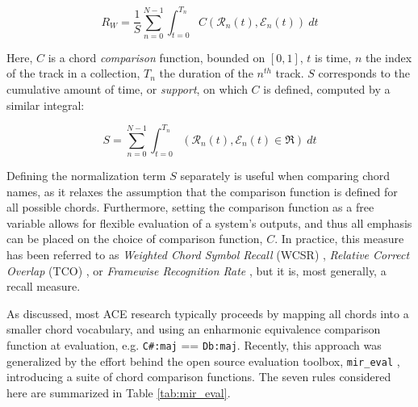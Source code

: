 \begin{equation}
\label{eq:recall_micro}
R_{W} = \frac{1}{S}\sum_{n=0}^{N-1}\int_{t=0}^{T_n}C(\mathcal{R}_n(t), \mathcal{E}_n(t))~dt
\end{equation}

\noindent Here, $C$ is a chord \emph{comparison} function, bounded on $[0, 1]$, $t$ is time, $n$ the index of the track in a collection, $T_n$ the duration of the $n^{th}$ track. $S$ corresponds to the cumulative amount of time, or \emph{support}, on which $C$ is defined, computed by a similar integral:

\begin{equation}
S = \sum_{n=0}^{N-1}\int_{t=0}^{T_n}(\mathcal{R}_n(t), \mathcal{E}_n(t) \in \Re)~dt
\end{equation}

Defining the normalization term $S$ separately is useful when comparing chord names, as it relaxes the assumption that the comparison function is defined for all possible chords.
Furthermore, setting the comparison function as a free variable allows for flexible evaluation of a system's outputs, and thus all emphasis can be placed on the choice of comparison function, $C$.
In practice, this measure has been referred to as \emph{Weighted Chord Symbol Recall} (WCSR) \cite{Harte2010Towards}, \emph{Relative Correct Overlap} (TCO) \cite{McVicar2013Machine}, or \emph{Framewise Recognition Rate} \cite{Cho2014Improved}, but it is, most generally, a recall measure.

As discussed, most ACE research typically proceeds by mapping all chords into a smaller chord vocabulary, and using an enharmonic equivalence comparison function at evaluation, e.g. \texttt{C\#:maj} == \texttt{Db:maj}.
Recently, this approach was generalized by the effort behind the open source evaluation toolbox, \texttt{mir\_eval} \cite{Raffel2014Eval}, introducing a suite of chord comparison functions.
The seven rules considered here are summarized in Table \ref{tab:mir_eval}.

